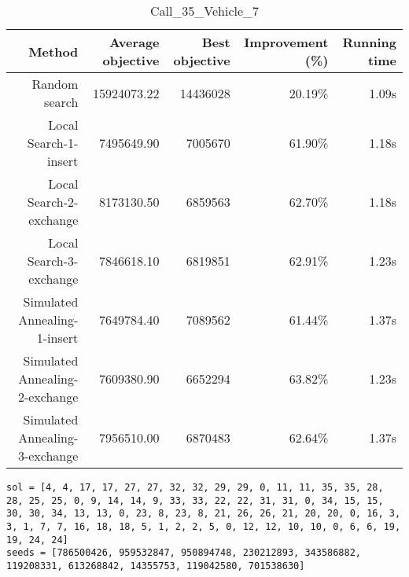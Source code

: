 \begin{table}[ht]
\centering
\caption{Call\_35\_Vehicle\_7}
\label{tab:call35vehicle7}
\begin{tabular}{|r|r|r|r|r|}
Method & Average objective & Best objective & Improvement (\%) & Running time \\
\hline
Random search & 15924073.22 & 14436028 & 20.19\% & 1.09s\\
Local Search-1-insert & 7495649.90 & 7005670 & 61.90\% & 1.18s\\
Local Search-2-exchange & 8173130.50 & 6859563 & 62.70\% & 1.18s\\
Local Search-3-exchange & 7846618.10 & 6819851 & 62.91\% & 1.23s\\
Simulated Annealing-1-insert & 7649784.40 & 7089562 & 61.44\% & 1.37s\\
Simulated Annealing-2-exchange & 7609380.90 & 6652294 & 63.82\% & 1.23s\\
Simulated Annealing-3-exchange & 7956510.00 & 6870483 & 62.64\% & 1.37s\\
\end{tabular}%
\end{table}
\begin{lstlisting}[label={lst:call35vehicle7},caption=Optimal solution call\_35\_vehicle\_7]
sol = [4, 4, 17, 17, 27, 27, 32, 32, 29, 29, 0, 11, 11, 35, 35, 28, 28, 25, 25, 0, 9, 14, 14, 9, 33, 33, 22, 22, 31, 31, 0, 34, 15, 15, 30, 30, 34, 13, 13, 0, 23, 8, 23, 8, 21, 26, 26, 21, 20, 20, 0, 16, 3, 3, 1, 7, 7, 16, 18, 18, 5, 1, 2, 2, 5, 0, 12, 12, 10, 10, 0, 6, 6, 19, 19, 24, 24]
seeds = [786500426, 959532847, 950894748, 230212893, 343586882, 119208331, 613268842, 14355753, 119042580, 701538630]
\end{lstlisting}%
\clearpage


